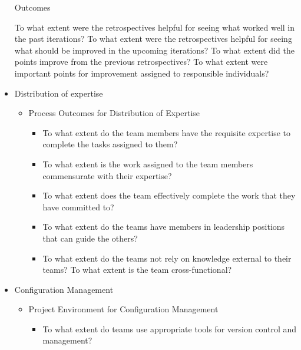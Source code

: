 \begin{appendices}
\begin{itemize}
\begin{itemize}
\begin{itemize}
				\end{itemize}
		\end{itemize}
		\begin{itemize}
			\addition Outcomes
				\begin{itemize}
					\addition To what extent were the retrospectives helpful for seeing what worked well in the past iterations?
					\addition To what extent were the retrospectives helpful for seeing what should be improved in the upcoming iterations?
					\addition To what extent did the points improve from the previous retrospectives?
				\addition To what extent were important points for improvement assigned to responsible individuals?
				\end{itemize}	 
		\end{itemize}
	\item Distribution of expertise 
		\begin{itemize}
			\item Process Outcomes for Distribution of Expertise
				\begin{itemize}
					\item To what extent do the team members have the requisite expertise to complete the tasks assigned to them? 
					\item To what extent is the work assigned to the team members commensurate with their expertise? 
					\item To what extent does the team effectively complete the work that they have committed to? 
					\item To what extent do the teams have members in leadership positions that can guide the others? 
					\item To what extent do the teams not rely on knowledge external to their teams? 
					\addition To what extent is the team cross-functional?
				\end{itemize}
		\end{itemize}
	\item Configuration Management
		\begin{itemize}
			\item Project Environment for Configuration Management
				\begin{itemize}
					\item To what extent do teams use appropriate tools for version control and management?
				\end{itemize}

\end{itemize}
\end{itemize}
\end{appendices}

